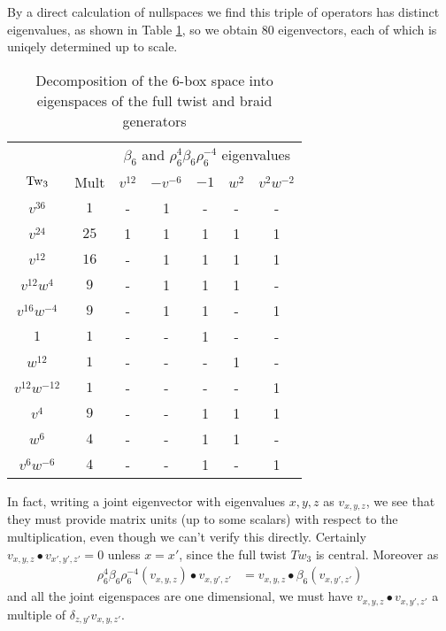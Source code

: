 \documentclass[12pt]{amsart}
\begin{document}
By a direct calculation of nullspaces we find this triple of operators has distinct eigenvalues, as shown in Table \ref{tab:braid-gen}, so we obtain 80 eigenvectors, each of which is uniqely determined up to scale. 
\begin{table}
  \centering
  \begin{tabular}{ccccccc}
    \toprule
    &&\multicolumn{5}{c}{$\beta_6$ and $\rho_6^4 \beta_6 \rho_6^{-4}$ eigenvalues} \\ \cmidrule(l){3-7}
   $\operatorname{Tw}_3$ & Mult & $v^{12}$ & $-v^{-6}$ & $-1$ & $w^2$ & $v^2w^{-2}$ \\
    \midrule
   $v^{36}$        & $1$  & - & 1 & - & - & - \\[2pt]
   $v^{24}$        & $25$ & 1 & 1 & 1 & 1 & 1 \\[2pt]
   $v^{12}$        & $16$ & - & 1 & 1 & 1 & 1 \\[2pt]
   $v^{12}w^4$     & $9$  & - & 1 & 1 & 1 & - \\[2pt]
   $v^{16}w^{-4}$  & $9$  & - & 1 & 1 & - & 1 \\[2pt]
   $1$             & $1$  & - & - & 1 & - & - \\[2pt]
   $w^{12}$        & $1$  & - & - & - & 1 & - \\[2pt]
   $v^{12}w^{-12}$ & $1$  & - & - & - & - & 1 \\[2pt]
   $v^4$           & $9$  & - & - & 1 & 1 & 1 \\[2pt]
   $w^6$           & $4$  & - & - & 1 & 1 & - \\[2pt]
   $v^6w^{-6}$     & $4$  & - & - & 1 & - & 1 \\
    \bottomrule
  \end{tabular}
  \medskip
  \caption{Decomposition of the 6-box space into eigenspaces of the full twist and braid generators}\label{tab:braid-gen}
\end{table}

In fact, writing a joint eigenvector with eigenvalues $x,y,z$ as $v_{x,y,z}$, we see that
they must provide matrix units (up to some scalars) with respect to the multiplication,
even though we can't verify this directly.
Certainly $v_{x,y,z} \bullet v_{x',y',z'} = 0$ unless $x = x'$, since the full twist $Tw_3$ is central.
Moreover as
\begin{align*}
\rho_6^4 \beta_6 \rho_6^{-4}(v_{x,y,z}) \bullet v_{x,y',z'} 
  & = v_{x,y,z} \bullet \beta_6 (v_{x,y',z'})
\end{align*}
and all the joint eigenspaces are one dimensional, we must have $v_{x,y,z} \bullet v_{x,y',z'}$ a
multiple of $\delta_{z,y'} v_{x,y,z'}$.
\end{document}
